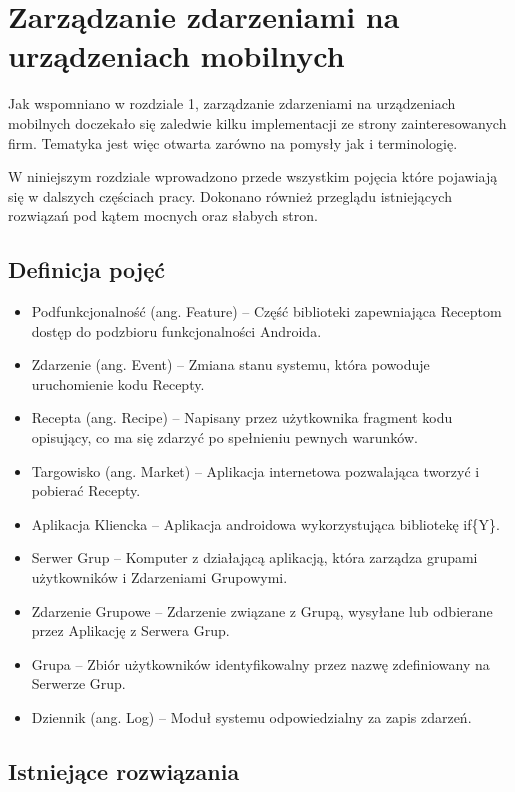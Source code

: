\documentclass[11pt,a4paper,polish,thesis]{dcsbook}
\begin{document}
\chapter{Zarządzanie zdarzeniami na urządzeniach mobilnych}
Jak wspomniano w rozdziale 1, zarządzanie zdarzeniami na urządzeniach mobilnych doczekało się zaledwie kilku implementacji ze strony zainteresowanych firm.
Tematyka jest więc otwarta zarówno na pomysły jak i terminologię.

W niniejszym rozdziale wprowadzono przede wszystkim pojęcia które pojawiają się w dalszych częściach pracy. Dokonano również przeglądu istniejących rozwiązań
pod kątem mocnych oraz słabych stron.

\section{Definicja pojęć}
\begin{itemize}
\item Podfunkcjonalność (ang. Feature) -- Część biblioteki zapewniająca Receptom dostęp do podzbioru funkcjonalności Androida.
\item Zdarzenie (ang. Event) -- Zmiana stanu systemu, która powoduje uruchomienie kodu Recepty.
\item Recepta (ang. Recipe) -- Napisany przez użytkownika fragment kodu opisujący, co ma się zdarzyć po spełnieniu pewnych warunków.
\item Targowisko (ang. Market) -- Aplikacja internetowa pozwalająca tworzyć i pobierać Recepty.
\item Aplikacja Kliencka -- Aplikacja androidowa wykorzystująca bibliotekę if\{Y\}. 
\item Serwer Grup -- Komputer z działającą aplikacją, która zarządza grupami użytkowników i Zdarzeniami Grupowymi.
\item Zdarzenie Grupowe -- Zdarzenie związane z Grupą, wysyłane lub odbierane przez Aplikację z Serwera Grup.
\item Grupa -- Zbiór użytkowników identyfikowalny przez nazwę zdefiniowany na Serwerze Grup.
\item Dziennik (ang. Log) -- Moduł systemu odpowiedzialny za zapis zdarzeń.
\end{itemize}
\section{Istniejące rozwiązania}
\end{document}

